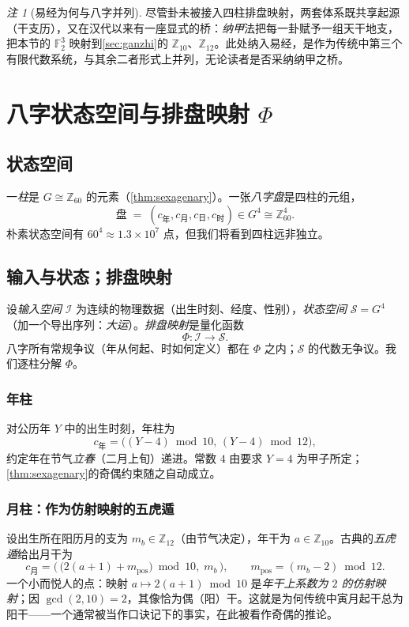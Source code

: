 \documentclass[11pt,a4paper,fontset=none]{ctexart}
\theoremstyle{definition}
\theoremstyle{remark}
\newtheorem*{remark}{注}
\newcommand{\Z}{\mathbb{Z}}
\newcommand{\F}{\mathbb{F}}
\begin{document}
\begin{remark}[易经为何与八字并列]\label{rem:najia}
尽管卦未被接入四柱排盘映射，两套体系既共享起源（干支历），又在汉代以来有一座显式的桥：\emph{纳甲}法把每一卦赋予一组天干地支，把本节的 $\F_2^3$ 映射到\cref{sec:ganzhi}的 $\Z_{10}$、$\Z_{12}$。此处纳入易经，是作为传统中第三个有限代数系统，与其余二者形式上并列，无论读者是否采纳纳甲之桥。
\end{remark}

\section{八字状态空间与排盘映射 \texorpdfstring{$\Phi$}{Phi}}\label{sec:bazi}

\subsection{状态空间}
一\emph{柱}是 $G\cong\Z_{60}$ 的元素（\cref{thm:sexagenary}）。一张\emph{八字盘}是四柱的元组，
\[
\text{盘}\;=\;(c_{\text{年}},c_{\text{月}},c_{\text{日}},c_{\text{时}})\in G^4\cong\Z_{60}^4.
\]
朴素状态空间有 $60^4\approx 1.3\times10^7$ 点，但我们将看到四柱远非独立。

\subsection{输入与状态；排盘映射}
设\emph{输入空间} $\mathcal{I}$ 为连续的物理数据（出生时刻、经度、性别），\emph{状态空间} $\mathcal{S}=G^4$（加一个导出序列：\emph{大运}）。\emph{排盘映射}是量化函数
\[
\Phi:\mathcal{I}\longrightarrow\mathcal{S}.
\]
八字所有常规争议（年从何起、时如何定义）都在 $\Phi$ 之内；$\mathcal{S}$ 的代数无争议。我们逐柱分解 $\Phi$。

\subsubsection*{年柱}
对公历年 $Y$ 中的出生时刻，年柱为
\[
c_{\text{年}}=\big((Y-4)\bmod 10,\,(Y-4)\bmod 12\big),
\]
约定年在节气\emph{立春}（二月上旬）递进。常数 $4$ 由要求 $Y=4$ 为甲子所定；\cref{thm:sexagenary}的奇偶约束随之自动成立。

\subsubsection*{月柱：作为仿射映射的五虎遁}
设出生所在阳历月的支为 $m_b\in\Z_{12}$（由节气决定），年干为 $a\in\Z_{10}$。古典的\emph{五虎遁}给出月干为
\[
c_{\text{月}}=\big(\,\big(2(a+1)+m_{\text{pos}}\big)\bmod 10,\;m_b\,\big),\qquad m_{\text{pos}}=(m_b-2)\bmod 12.
\]
一个小而悦人的点：映射 $a\mapsto 2(a+1)\bmod 10$ 是\emph{年干上系数为 $2$ 的仿射映射}；因 $\gcd(2,10)=2$，其像恰为偶（阳）干。这就是为何传统中寅月起干总为阳干——一个通常被当作口诀记下的事实，在此被看作奇偶的推论。
\end{document}
